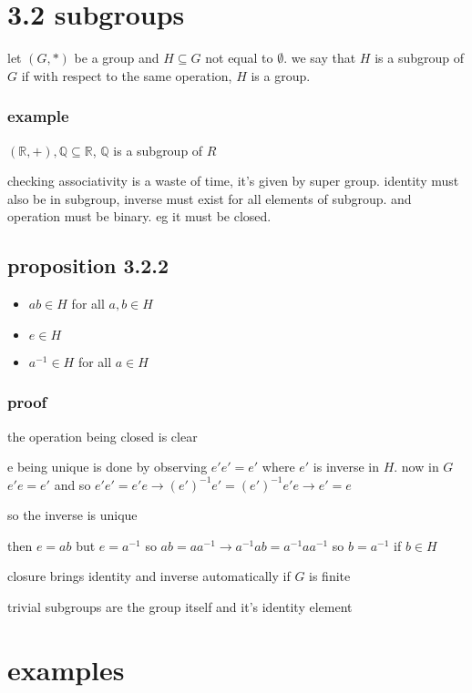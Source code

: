 \documentclass[letterpaper]{article}
\begin{document}
\section*{3.2 subgroups}
let $(G,*)$ be a group and $H\subseteq G$ not equal to $\emptyset$. we say that $H$ is a subgroup of $G$ if with respect to the same operation, $H$ is a group.

\subsubsection*{example}
$(\mathbb{R},+), \mathbb{Q}\subseteq\mathbb{R}$, $\mathbb{Q}$ is a subgroup of $R$

checking associativity is a waste of time, it's given by super group. identity must also be in subgroup, inverse must exist for all elements of subgroup. and operation must be binary. eg it must be closed.

\subsection*{proposition 3.2.2}
\begin{itemize}
\item
$ab\in H$ for all $a,b\in H$
\item
$e\in H$
\item
$a^{-1}\in H$ for all $a\in H$
\end{itemize}
\subsubsection*{proof}
the operation being closed is clear

e being unique is done by observing $e'e'=e'$ where $e'$ is inverse in $H$. now in $G$ $e'e=e'$ and so $e'e'=e'e\to(e')^{-1}e'=(e')^{-1}e'e\to e'=e$

so the inverse is unique

then $e=ab$ but $e=a^{-1}$ so $ab=aa^{-1}\to a^{-1}ab=a^{-1}aa^{-1}$ so $b=a^{-1}$ if $b\in H$


closure brings identity and inverse automatically if $G$ is finite

trivial subgroups are the group itself and it's identity element
\section*{examples}
\end{document}
